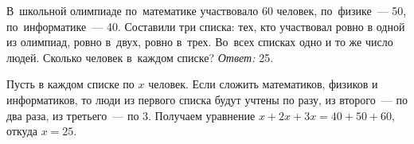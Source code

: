 \problem
В~школьной олимпиаде по~математике участвовало 60 человек, по~физике~--- 50,
по~информатике~--- 40.
Составили три списка: тех, кто участвовал ровно в одной из олимпиад, ровно
в~двух, ровно в~трех.
Во~всех списках одно и то же число людей.
Сколько человек в~каждом списке?
\solution
\emph{Ответ:} 25.
\par
Пусть в каждом списке по $x$ человек.
Если сложить математиков, физиков и информатиков, то люди из первого списка
будут учтены по разу, из второго~--- по два раза, из третьего~--- по 3.
Получаем уравнение $x + 2 x + 3 x = 40 + 50 + 60$, откуда $x = 25$.
\endproblem
